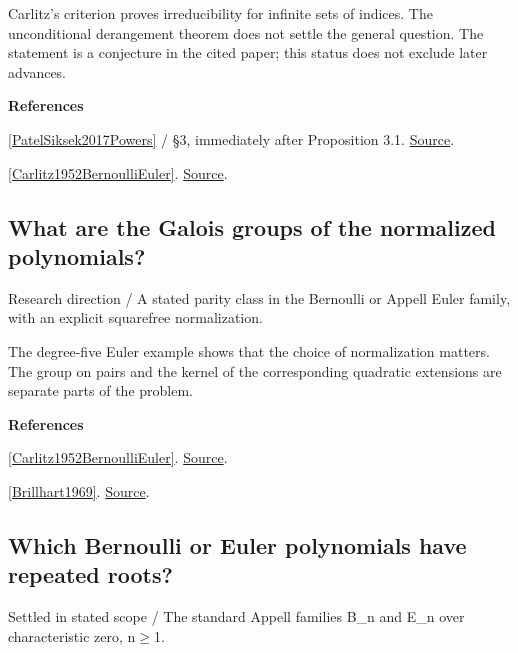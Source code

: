 \documentclass[11pt,a4paper,oneside,openany]{book}
\newenvironment{sources}{\par\smallskip\begingroup\footnotesize\color{atlasgray}\leftskip=10pt\setlength{\parskip}{2pt}}{\par\endgroup\smallskip}
\begin{document}
\color{black} Carlitz's criterion proves irreducibility for infinite sets of indices. The unconditional derangement theorem does not settle the general question. The statement is a conjecture in the cited paper; this status does not exclude later advances.\par
\begin{sources}
\textbf{References}\par\smallskip
\noindent\hyperlink{ref:PatelSiksek2017Powers}{[PatelSiksek2017Powers]} / §3, immediately after Proposition 3.1.  \href{https://doi.org/10.1007/s40993-016-0068-0}{Source}.\par
\noindent\hyperlink{ref:Carlitz1952BernoulliEuler}{[Carlitz1952BernoulliEuler]}.  \href{https://doi.org/10.1215/S0012-7094-52-01948-0}{Source}.\par
\end{sources}\color{black}
\subsection*{What are the Galois groups of the normalized polynomials?}
{\small\sffamily\color{atlasgold}Research direction / A stated parity class in the Bernoulli or Appell Euler family, with an explicit squarefree normalization.}\par\smallskip
\color{black} The degree-five Euler example shows that the choice of normalization matters. The group on pairs and the kernel of the corresponding quadratic extensions are separate parts of the problem.\par
\begin{sources}
\textbf{References}\par\smallskip
\noindent\hyperlink{ref:Carlitz1952BernoulliEuler}{[Carlitz1952BernoulliEuler]}.  \href{https://doi.org/10.1215/S0012-7094-52-01948-0}{Source}.\par
\noindent\hyperlink{ref:Brillhart1969}{[Brillhart1969]}.  \href{https://doi.org/10.1515/crll.1969.234.45}{Source}.\par
\end{sources}\color{black}
\subsection*{Which Bernoulli or Euler polynomials have repeated roots?}
{\small\sffamily\color{atlasgold}Settled in stated scope / The standard Appell families B\_\allowbreak{}n and E\_\allowbreak{}n over characteristic zero, n\ensuremath{\ge}1.}\par\smallskip
\end{document}
